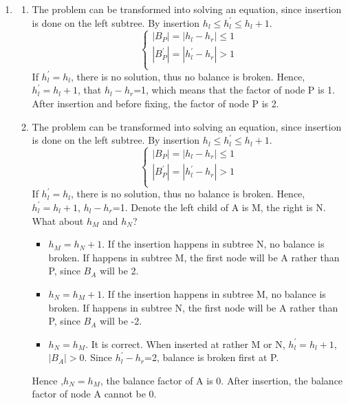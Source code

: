 \documentclass[12pt,a4paper]{article}
\makeatletter
\newtheorem*{solution}{Solution}
\theoremstyle{definition}
\renewenvironment{solution}[1][Solution] {\par\pushQED{\qed}\normalfont\topsep6\p@\@plus6\p@\relax\trivlist\item[\hskip\labelsep\bfseries#1\@addpunct{.}]\ignorespaces}{\popQED\endtrivlist\@endpefalse} \makeatother
\makeatother
\begin{document}
\begin{enumerate}
\begin{solution} 
\begin{enumerate}
    \item The problem can be transformed into solving an equation, since insertion is done on the left subtree. By insertion $h_l \leq h_l^{'} \leq h_l+1$.
    \begin{equation}
        \left\{
                \begin{array}{lr}
                     |B_P| = |h_l-h_r| \leq 1  \\
                     |B_P^{'}| = |h_l^{'}-h_r| > 1  \\ 
                \end{array}
        \right.
    \end{equation}
    If $h_l^{'}=h_l$, there is no solution, thus no balance is broken. Hence, $h_l^{'}=h_l+1$, that $h_l-h_r$=1, which means that the factor of node P is 1. After insertion and before fixing, the factor of node P is 2.
    \item The problem can be transformed into solving an equation, since insertion is done on the left subtree. By insertion $h_l \leq h_l^{'} \leq h_l+1$.
    \begin{equation}
        \left\{
                \begin{array}{lr}
                     |B_P| = |h_l-h_r| \leq 1  \\
                     |B_P^{'}| = |h_l^{'}-h_r| > 1  \\ 
                \end{array}
        \right.
    \end{equation}
    If $h_l^{'}=h_l$, there is no solution, thus no balance is broken. Hence, $h_l^{'}=h_l+1$, $h_l-h_r$=1.
    Denote the left child of A is M, the right is N. What about $h_M$ and $h_N$?
    \begin{itemize}
        \item $h_M=h_N+1$. If the insertion happens in subtree N, no balance is broken. If happens in subtree M, the first node will be A rather than P, since $B_A$ will be 2.
        \item $h_N=h_M+1$. If the insertion happens in subtree M, no balance is broken. If happens in subtree N, the first node will be A rather than P, since $B_A$ will be -2.
        \item $h_N=h_M$. It is correct. When inserted at rather M or N, $h_l^{'}=h_l+1$, $|B_A|>0$. Since $h_l^{'}-h_r$=2, balance is broken first at P.
    \end{itemize}
    Hence ,$h_N=h_M$, the balance factor of A is 0. After insertion, the balance factor of node A cannot be 0.
\end{enumerate}
\end{solution}

\end{enumerate}

\end{document}
